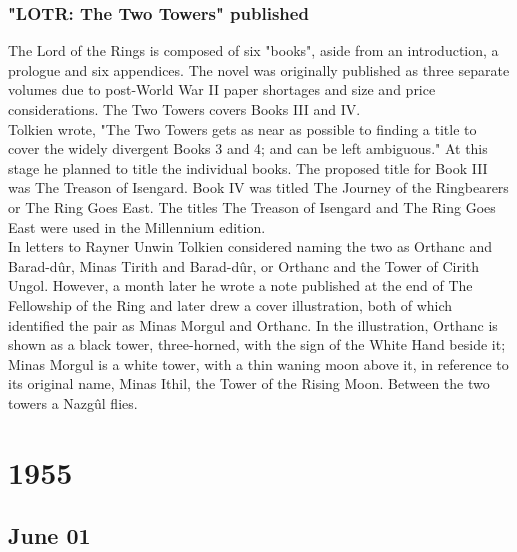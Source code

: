 \documentclass[11pt]{report}
\begin{document}
\subsection{"LOTR: The Two Towers" published}
The Lord of the Rings is composed of six "books", aside from an introduction, a prologue and six appendices. The novel was originally published as three separate volumes due to post-World War II paper shortages and size and price considerations. The Two Towers covers Books III and IV.\\
\indent Tolkien wrote, "The Two Towers gets as near as possible to finding a title to cover the widely divergent Books 3 and 4; and can be left ambiguous." At this stage he planned to title the individual books. The proposed title for Book III was The Treason of Isengard. Book IV was titled The Journey of the Ringbearers or The Ring Goes East. The titles The Treason of Isengard and The Ring Goes East were used in the Millennium edition.\\
\indent In letters to Rayner Unwin Tolkien considered naming the two as Orthanc and Barad-dûr, Minas Tirith and Barad-dûr, or Orthanc and the Tower of Cirith Ungol. However, a month later he wrote a note published at the end of The Fellowship of the Ring and later drew a cover illustration, both of which identified the pair as Minas Morgul and Orthanc. In the illustration, Orthanc is shown as a black tower, three-horned, with the sign of the White Hand beside it; Minas Morgul is a white tower, with a thin waning moon above it, in reference to its original name, Minas Ithil, the Tower of the Rising Moon. Between the two towers a Nazgûl flies.

\chapter{1955}
\section{June 01}
\end{document}
